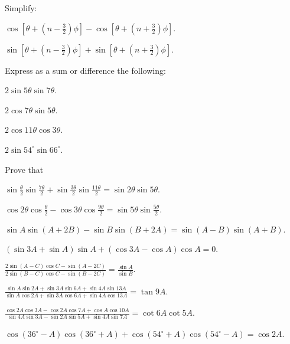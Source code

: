 Simplify:


\item $\cos\left[\theta + \left(n - \frac{3}{2}\right)\phi\right] - \cos\left[\theta + \left(n + \frac{3}{2}\right)\phi\right]$.

\item $\sin\left[\theta + \left(n - \frac{3}{2}\right)\phi\right] + \sin\left[\theta + \left(n + \frac{3}{2}\right)\phi\right]$.
\stopitemize

Express as a sum or difference the  following:

\item $2\sin5\theta\sin7\theta$.

\item $2\cos7\theta\sin5\theta$.

\item $2\cos 11\theta\cos 3\theta$.

\item $2\sin54^\circ\sin66^\circ$.
\stopitemize

Prove that

\item $\sin\frac{\theta}{2}\sin\frac{7\theta}{2} + \sin \frac{3\theta}{2}\sin\frac{11\theta}{2} =\sin 2\theta\sin 5\theta$.

\item $\cos 2\theta\cos \frac{\theta}{2} -\cos3\theta\cos\frac{9\theta}{2} = \sin5\theta\sin\frac{5\theta}{2}$.

\item $\sin A\sin(A + 2B) - \sin B\sin(B + 2A) = \sin(A - B)\sin(A + B)$.

\item $(\sin 3A + \sin A)\sin A + (\cos 3A - \cos A)\cos A = 0$.

\item $\frac{2\sin(A - C)\cos C - \sin(A - 2C)}{2\sin(B - C)\cos C - \sin(B - 2C)} = \frac{\sin A}{\sin B}$.

\item $\frac{\sin A\sin 2A + \sin 3A\sin 6A + \sin4A\sin 13A}{\sin A\cos2A + \sin 3A\cos 6A + \sin 4A\cos 13A} = \tan 9A$.

\item $\frac{\cos 2A\cos 3A - \cos 2A\cos 7A + \cos A\cos 10A}{\sin 4A\sin 3A - \sin 2A\sin 5A + \sin 4A\sin 7A} =\cot 6A\cot 5A$.

\item $\cos(36^\circ - A)\cos(36^\circ + A) + \cos(54^\circ + A)\cos(54^\circ - A) = \cos 2A$.

